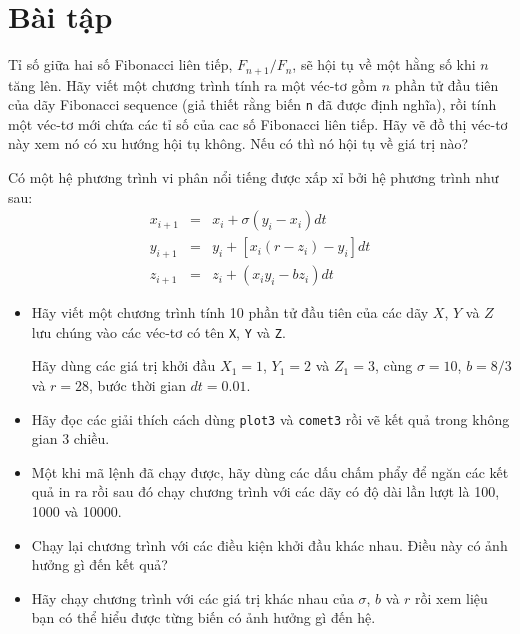 \documentclass[12pt]{book}
\begin{document}
\section{Bài tập}

\begin{ex}
\label{fibratio}

Tỉ số giữa hai số Fibonacci liên tiếp, $F_{n+1}/F_{n}$, sẽ hội tụ về
một hằng số khi $n$ tăng lên. Hãy viết một chương trình tính ra một
véc-tơ gồm $n$ phần tử đầu tiên của dãy Fibonacci sequence (giả thiết
rằng biến {\tt n} đã được định nghĩa), rồi tính một véc-tơ mới chứa
các tỉ số của cac số Fibonacci liên tiếp. Hãy vẽ đồ thị véc-tơ này 
xem nó có xu hướng hội tụ không. Nếu có thì nó hội tụ về giá trị nào?

\end{ex}

\begin{ex}
Có một hệ phương trình vi phân nổi tiếng được xấp xỉ bởi hệ phương trình
như sau:
%
\begin{eqnarray}
x_{i+1} &=& x_i + \sigma \left( y_i - x_i \right) dt  \\
y_{i+1} &=& y_i + \left[ x_i (r - z_i) - y_i \right] dt   \\
z_{i+1} &=& z_i + \left( x_i y_i - b z_i \right) dt
\end{eqnarray}
%
\begin{itemize}

\item Hãy viết một chương trình tính 10 phần tử đầu tiên của các dãy
$X$, $Y$ và $Z$ lưu chúng vào các véc-tơ có tên {\tt X}, {\tt Y}
và {\tt Z}.

Hãy dùng các giá trị khởi đầu $X_1 = 1$, $Y_1 = 2$ và $Z_1 = 3$, cùng
$\sigma = 10$, $b = 8/3$ và $r = 28$, bước thời gian $dt = 0.01$.

\item Hãy đọc các giải thích cách dùng {\tt plot3} và {\tt comet3} rồi
vẽ kết quả trong không gian 3 chiều.

\item Một khi mã lệnh đã chạy được, hãy dùng các dấu chấm phẩy để
ngăn các kết quả in ra rồi sau đó chạy chương trình với các dãy
có độ dài lần lượt là 100, 1000 và 10000.

\item Chạy lại chương trình với các điều kiện khởi đầu khác nhau.
Điều này có ảnh hưởng gì đến kết quả?

\item Hãy chạy chương trình với các giá trị khác nhau của $\sigma$, 
$b$ và $r$ rồi xem liệu bạn có thể hiểu được từng biến có ảnh hưởng
gì đến hệ.

\end{itemize}

\end{ex}
\end{document}
